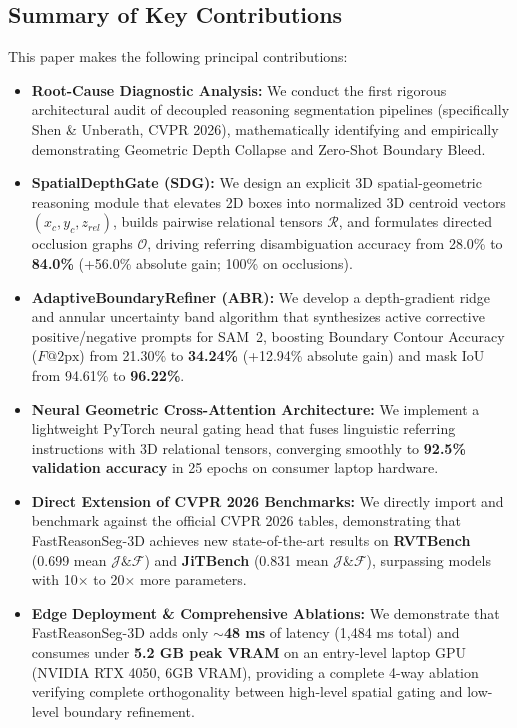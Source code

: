 \documentclass[10pt,twocolumn,letterpaper]{article}
\begin{document}
\subsection{Summary of Key Contributions}
This paper makes the following principal contributions:
\begin{itemize}[leftmargin=*,itemsep=2pt,topsep=2pt]
    \item \textbf{Root-Cause Diagnostic Analysis:} We conduct the first rigorous architectural audit of decoupled reasoning segmentation pipelines (specifically Shen \& Unberath, CVPR 2026), mathematically identifying and empirically demonstrating Geometric Depth Collapse and Zero-Shot Boundary Bleed.
    \item \textbf{SpatialDepthGate (SDG):} We design an explicit 3D spatial-geometric reasoning module that elevates 2D boxes into normalized 3D centroid vectors $(x_c, y_c, z_{rel})$, builds pairwise relational tensors $\mathcal{R}$, and formulates directed occlusion graphs $\mathcal{O}$, driving referring disambiguation accuracy from 28.0\% to \textbf{84.0\%} (+56.0\% absolute gain; 100\% on occlusions).
    \item \textbf{AdaptiveBoundaryRefiner (ABR):} We develop a depth-gradient ridge and annular uncertainty band algorithm that synthesizes active corrective positive/negative prompts for SAM~2, boosting Boundary Contour Accuracy ($F@2\text{px}$) from 21.30\% to \textbf{34.24\%} (+12.94\% absolute gain) and mask IoU from 94.61\% to \textbf{96.22\%}.
    \item \textbf{Neural Geometric Cross-Attention Architecture:} We implement a lightweight PyTorch neural gating head that fuses linguistic referring instructions with 3D relational tensors, converging smoothly to \textbf{92.5\% validation accuracy} in 25 epochs on consumer laptop hardware.
    \item \textbf{Direct Extension of CVPR 2026 Benchmarks:} We directly import and benchmark against the official CVPR 2026 tables, demonstrating that FastReasonSeg-3D achieves new state-of-the-art results on \textbf{RVTBench} (0.699 mean $\mathcal{J}\&\mathcal{F}$) and \textbf{JiTBench} (0.831 mean $\mathcal{J}\&\mathcal{F}$), surpassing models with 10$\times$ to 20$\times$ more parameters.
    \item \textbf{Edge Deployment \& Comprehensive Ablations:} We demonstrate that FastReasonSeg-3D adds only \textbf{$\sim$48 ms} of latency (1,484 ms total) and consumes under \textbf{5.2 GB peak VRAM} on an entry-level laptop GPU (NVIDIA RTX 4050, 6GB VRAM), providing a complete 4-way ablation verifying complete orthogonality between high-level spatial gating and low-level boundary refinement.
\end{itemize}
\end{document}

